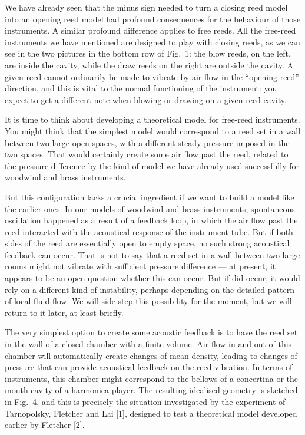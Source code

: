   We have already seen that the minus sign needed to turn a closing reed model 
  into an opening reed model had profound consequences for the behaviour of 
  those instruments. A similar profound difference applies to free reeds. All 
  the free-reed instruments we have mentioned are designed to play with closing 
  reeds, as we can see in the two pictures in the bottom row of Fig.\ 1: the 
  blow reeds, on the left, are inside the cavity, while the draw reeds on the 
  right are outside the cavity. A given reed cannot ordinarily be made to 
  vibrate by air flow in the ``opening reed'' direction, and this is vital to 
  the normal functioning of the instrument: you expect to get a different note 
  when blowing or drawing on a given reed cavity. 

  It is time to think about developing a theoretical model for free-reed 
  instruments. You might think that the simplest model would correspond to a 
  reed set in a wall between two large open spaces, with a different steady 
  pressure imposed in the two spaces. That would certainly create some air flow 
  past the reed, related to the pressure difference by the kind of model we 
  have already used successfully for woodwind and brass instruments. 

  But this configuration lacks a crucial ingredient if we want to build a model 
  like the earlier ones. In our models of woodwind and brass instruments, 
  spontaneous oscillation happened as a result of a feedback loop, in which the 
  air flow past the reed interacted with the acoustical response of the 
  instrument tube. But if both sides of the reed are essentially open to empty 
  space, no such strong acoustical feedback can occur. That is not to say that 
  a reed set in a wall between two large rooms might not vibrate with 
  sufficient pressure difference — at present, it appears to be an open 
  question whether this can occur. But if did occur, it would rely on a 
  different kind of instability, perhaps depending on the detailed pattern of 
  local fluid flow. We will side-step this possibility for the moment, but we 
  will return to it later, at least briefly. 

  The very simplest option to create some acoustic feedback is to have the reed 
  set in the wall of a closed chamber with a finite volume. Air flow in and out 
  of this chamber will automatically create changes of mean density, leading to 
  changes of pressure that can provide acoustical feedback on the reed 
  vibration. In terms of instruments, this chamber might correspond to the 
  bellows of a concertina or the mouth cavity of a harmonica player. The 
  resulting idealised geometry is sketched in Fig.\ 4, and this is precisely 
  the situation investigated by the experiment of Tarnopolsky, Fletcher and Lai 
  [1], designed to test a theoretical model developed earlier by Fletcher [2]. 

